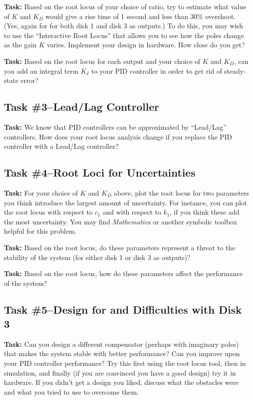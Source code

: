 \noindent \textbf{Task:}  Based on the root locus of your choice of ratio, 
try to estimate what value of $K$ and $K_D$ would give a rise time of 1 second
and less than 30\% overshoot.  (Yes, again for for both disk 1 and disk 3 as
outputs.)  To do this, you may wish to use the ``Interactive Root Locus''
that allows you to see how the poles change as the gain $K$ varies.  Implement
your design in hardware.  How close do you get?

\noindent \textbf{Task:}  Based on the root locus for each output and your
choice of $K$ and $K_D$, can you add an integral term $K_I$ to your PID
controller in order to get rid of steady-state error?

\subsection{Task \#3--Lead/Lag Controller}

\noindent \textbf{Task:}  We know that PID controllers can be approximated by
``Lead/Lag'' controllers.  How does your root locus analysis change if you
replace the PID controller with a Lead/Lag controller?  

\subsection{Task \#4--Root Loci for Uncertainties}

\noindent \textbf{Task:}  For your choice of $K$ and $K_D$ above, plot the root 
locus for two parameters you think introduce the largest amount of uncertainty.
For instance, you can plot the root locus with respect to $c_1$ and with respect
to $k_1$, if you think these add the most uncertainty.  You may find
\emph{Mathematica} or another symbolic toolbox helpful for this problem.

\noindent \textbf{Task:}  Based on the root locus, do these  parameters
represent a threat to the stability of the system (for either disk 1 or disk 3
as outputs)?

\noindent \textbf{Task:}  Based on the root locus, how do these parameters affect
the performance of the system?

\subsection{Task \#5--Design for and Difficulties with Disk 3}

\noindent \textbf{Task:}  Can you design a different compensator (perhaps with
imaginary poles) that makes the system stable with better performance?  Can you
improve upon your PID controller performance?  Try this first using the root
locus tool, then in simulation, and finally (if you are convinced you have a
good design) try it in hardware.  If you didn't get a design you liked, discuss
what the obstacles were and what you tried to use to overcome them.


